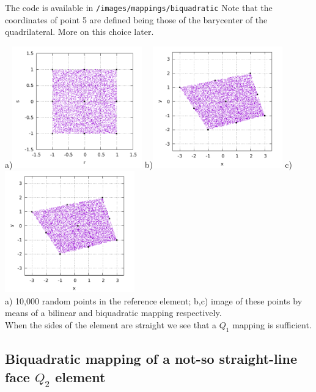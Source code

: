 The code is available in {\tt /images/mappings/biquadratic}
Note that the coordinates of point 5 are defined being those of the barycenter
of the quadrilateral. More on this choice later.

\begin{center}
a)\includegraphics[width=5.6cm]{images/mappings/biquadratic/rs.pdf}
b)\includegraphics[width=5.6cm]{images/mappings/biquadratic/xyQ1.pdf}
c)\includegraphics[width=5.6cm]{images/mappings/biquadratic/xyQ2.pdf}\\
{\captionfont a) 10,000 random points in the reference element; 
b,c) image of these points by means of a bilinear and biquadratic mapping 
respectively.\\ When the sides of the element
are straight we see that a $Q_1$ mapping is sufficient.}
\end{center}

\subsection{Biquadratic mapping of a not-so straight-line face $Q_2$ element }

